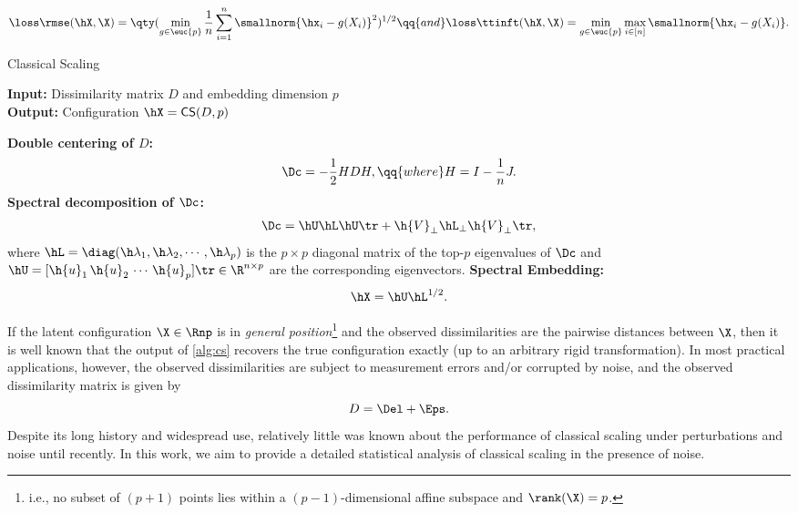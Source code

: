 \documentclass[10pt]{article}
\begin{document}
\begin{align}
    \loss\rmse(\hX, \X) = \qty(\min_{g \in \euc{p}} {\frac{1}{n}\sum_{i=1}^n\smallnorm{\hx_i - g(X_i)}^2})^{1/2} \qq{and} \loss\ttinft(\hX, \X) = \min_{g \in \euc{p}} \max_{i \in [n]}\smallnorm{\hx_i - g(X_i)}.\label{eq:losses}
\end{align}

\begin{algorithm}[t]
    \begin{minipage}{0.96\linewidth}
    \SetAlgoLined
    \caption{Classical Scaling}\label{alg:cs}
    \textbf{Input:} Dissimilarity matrix $D$ and embedding dimension $p$\\
    \textbf{Output:} Configuration $\hX = \mathsf{CS}(D, p)$
    \begin{algorithmic}[1]
        \State \textbf{Double centering of $D$:}
        $$
            \Dc = -\frac{1}{2} H D H, \qq{where} H = I - \frac{1}{n} J.
        $$
        \State\label{algline:cs-spectral-decomposition} \textbf{Spectral decomposition of $\Dc$:}
        \begin{align}
            \Dc = \hU \hL \hU\tr + \h{V}_\perp \hL_\perp \h{V}_\perp\tr,\label{eq:cs-spectral-decomposition}
        \end{align}
        where $\hL = \diag({\h\lambda_1, \h\lambda_2, \cdots, \h\lambda_p})$ is the $p\times p$ diagonal matrix of the top-$p$ eigenvalues of $\Dc$ and $\hU = [\h{u}_1\,\h{u}_2\,\cdots\,\h{u}_p]\tr \in \R^{n \times p}$ are the corresponding eigenvectors.
        \State \textbf{Spectral Embedding:}
        \begin{align}
            \hX = \hU \hL^{1/2}.\label{eq:hX}
        \end{align}
    \end{algorithmic}
\end{minipage}
\end{algorithm}

{If the latent configuration $\X \in \Rnp$ is in \textit{general position}\footnote{i.e., no subset of $(p+1)$ points lies within a $(p-1)$-dimensional affine subspace and $\rank(\X)=p$.}} and the observed dissimilarities are the pairwise distances between $\X$, then it is well known that the output of \cref{alg:cs} recovers the true configuration exactly (up to an arbitrary rigid transformation). In most practical applications, however, the observed dissimilarities are subject to measurement errors and/or corrupted by noise, and the observed dissimilarity matrix is given by
$$
D = \Del + \Eps.
$$ 
Despite its long history and widespread use, relatively little was known about the performance of classical scaling under perturbations and noise until recently. In this work, we aim to provide a detailed statistical analysis of classical scaling in the presence of noise.
\end{document}
